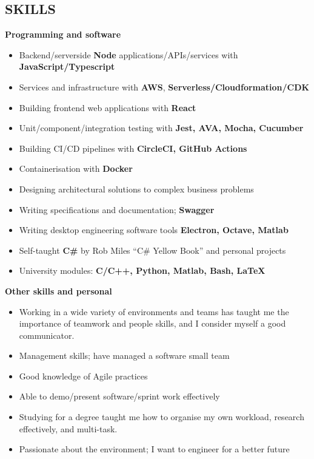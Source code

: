 \documentclass[overlap, line, 10pt]{res} %
\begin{document}
\begin{resume}
 
\section{SKILLS}

\textbf{Programming and software}  
\begin{itemize} \itemsep -1pt %
\item Backend/serverside {\bf Node} applications/APIs/services with {\bf JavaScript/Typescript}
\item Services and infrastructure with {\bf AWS}, {\bf Serverless/Cloudformation/CDK}
\item Building frontend web applications with {\bf React}
\item Unit/component/integration testing with {\bf Jest, AVA, Mocha, Cucumber} 
\item Building CI/CD pipelines with {\bf CircleCI, GitHub Actions}
\item Containerisation with {\bf Docker}
\item Designing architectural solutions to complex business problems
\item Writing specifications and documentation; {\bf Swagger}
\item Writing desktop engineering software tools {\bf Electron, Octave, Matlab}
\item Self-taught {\bf C\#} by Rob Miles ``C\# Yellow Book'' and personal projects
\item University modules: {\bf C/C++, Python, Matlab, Bash, LaTeX}
\end{itemize}

\textbf{Other skills and personal}
\begin{itemize} \itemsep -1pt %
\item Working in a wide variety of environments and teams has taught me the importance of teamwork and people skills, and I consider myself a good communicator.
\item Management skills; have managed a software small team
\item Good knowledge of Agile practices
\item Able to demo/present software/sprint work effectively
\item Studying for a degree taught me how to organise my own workload, research effectively, and multi-task. 
\item Passionate about the environment; I want to engineer for a better future
\end{itemize}


\end{resume}
\end{document}
